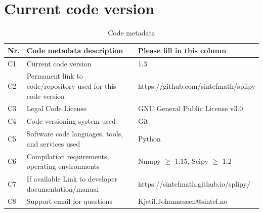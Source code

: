 \documentclass[preprint,12pt, a4paper]{elsarticle}
\begin{document}






\section*{Current code version}
\label{}


\begin{table}[!h]
\begin{tabular}{|l|p{5.5cm}|p{7.5cm}|}
\hline
\textbf{Nr.} & \textbf{Code metadata description} & \textbf{Please fill in this column} \\
\hline
C1 & Current code version & 1.3 \\
\hline
C2 & Permanent link to code/repository used for this code version & https://github.com/sintefmath/splipy \\
\hline
C3 & Legal Code License   & GNU General Public License v3.0  \\
\hline
C4 & Code versioning system used & Git \\
\hline
C5 & Software code languages, tools, and services used & Python \\
\hline
C6 & Compilation requirements, operating environments & Numpy $\geq$ 1.15, Scipy $\geq$ 1.2 \\
\hline
C7 & If available Link to developer documentation/manual & https://sintefmath.github.io/splipy/ \\
\hline
C8 & Support email for questions & Kjetil.Johannessen@sintef.no \\
\hline
\end{tabular}
\caption{Code metadata}
\label{}
\end{table}

%
%
\end{document}
